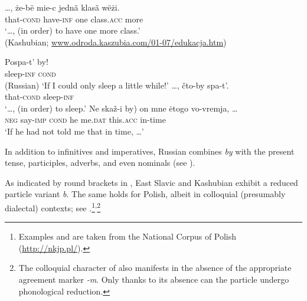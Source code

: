 \documentclass[output=paper]{langscibook}
\begin{document}
\ea\gll \ldots, że-bë mie-c {jednã klasã} wëżi. \\
{} that-\textsc{cond} have-\textsc{inf} {one class}.\textsc{acc} more \\
\glt `\ldots, (in order) to have one more class.'\\ \hfill \hfill (Kashubian; \url{www.odroda.kaszubia.com/01-07/edukacja.htm})
\label{pitsch:ex:ImpersCond_Kashubian}
\z

\ea
\ea\gll Pospa-t' by! \\
sleep-\textsc{inf} \textsc{cond} \\ \hfill (Russian) 
\glt `If I could only sleep a little while!' \hfill \citep[346]{Isacenko1962}
\ex\gll \ldots, čto-by spa-t'. \\
{} that-\textsc{cond} sleep-\textsc{inf} \\  
\glt `\ldots, (in order) to sleep.' 
\ex\gll Ne skaž-i \minsp{(} by) on mne ėtogo vo-vremja, \ldots \\
\textsc{neg} say-\textsc{imp} {} \textsc{cond} he me.\textsc{dat} this.\textsc{acc} in-time \\
\glt `If he had not told me that in time, \ldots' \hfill \citep[22]{Panzer1967}
\z
\label{pitsch:ex:ImpersCond_Russian}
\z

\noindent In addition to infinitives and imperatives, Russian combines \textit{by} with the present tense, participles, adverbs, and even nominals (see \cites[195]{Issatchenko1940}[21--23]{Panzer1967}). 

As indicated by round brackets in , East Slavic and Kashubian \citep[see][26]{Panzer1967} exhibit a reduced particle variant \textit{b}. The same holds for Polish, albeit in colloquial (presumably dialectal) contexts; see .\footnote{Examples  and  are taken from the National Corpus of Polish (\url{http://nkjp.pl/}).}\textsuperscript{,}\footnote{The colloquial character of  also manifests in the absence of the appropriate agreement marker \textit{-m}. Only thanks to its absence can the particle undergo phonological reduction.}

    \largerpage
\end{document}
